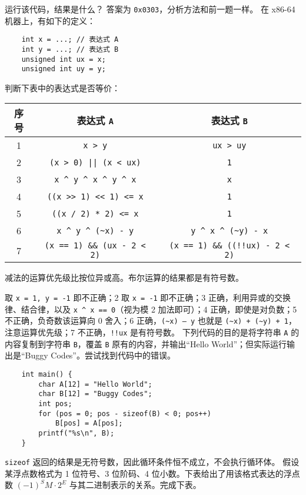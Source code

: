 \begin{problems}
		运行该代码，结果是什么？
		\sol 答案为 \verb|0x0303|，分析方法和前一题一样。
		\pro 在 x86-64 机器上，有如下的定义：
		\begin{verbatim}
    int x = ...; // 表达式 A
    int y = ...; // 表达式 B
    unsigned int ux = x;
    unsigned int uy = y;
		\end{verbatim}
		判断下表中的表达式是否等价：
		\begin{table}[H]
			\centering
			\begin{tabular}{|c|c|c|}
				\hline
				序号 & 表达式 \verb|A| & 表达式 \verb|B| \\ \hline
				1 & \verb|x > y| & \verb|ux > uy| \\ \hline
				2 & \verb+(x > 0) || (x < ux)+ & \verb|1| \\ \hline
				3 & \verb|x ^ y ^ x ^ y ^ x| & \verb|x| \\ \hline
				4 & \verb|((x >> 1) << 1) <= x| & \verb|1| \\ \hline
				5 & \verb|((x / 2) * 2) <= x| & \verb|1| \\ \hline
				6 & \verb|x ^ y ^ (~x) - y| & \verb|y ^ x ^ (~y) - x| \\ \hline
				7 & \verb|(x == 1) && (ux - 2 < 2)| & \verb|(x == 1) && ((!!ux) - 2 < 2)| \\ \hline
			\end{tabular}
		\end{table}
		\begin{hint}
			减法的运算优先级比按位异或高。布尔运算的结果都是有符号数。
		\end{hint}
		 取 \verb|x = 1, y = -1| 即不正确；2 取 \verb|x = -1| 即不正确；3 正确，利用异或的交换律、结合律，以及 \verb|x ^ x == 0|（视为模 2 加法即可）；4 正确，即使是对负数；5 不正确，负奇数该运算向 0 舍入；6 正确，\verb|(~x) – y| 也就是 \verb|(~x) + (~y) + 1|，注意运算优先级；7 不正确，\verb|!!ux| 是有符号数。
		\pro 下列代码的目的是将字符串 \texttt{A} 的内容复制到字符串 \texttt{B}，覆盖 \texttt{B} 原有的内容，并输出“Hello World”；但实际运行输出是“Buggy Codes”。尝试找到代码中的错误。
		\begin{verbatim}
    int main() {
        char A[12] = "Hello World";
        char B[12] = "Buggy Codes";
        int pos;
        for (pos = 0; pos - sizeof(B) < 0; pos++)
            B[pos] = A[pos];
        printf("%s\n", B);
    }
		\end{verbatim}
		\sol \verb|sizeof| 返回的结果是无符号数，因此循环条件恒不成立，不会执行循环体。
		\pro 假设某浮点数格式为 1 位符号、3 位阶码、4 位小数。下表给出了用该格式表达的浮点数 $(-1)^SM \cdot 2^E$ 与其二进制表示的关系。完成下表。

\end{problems}
